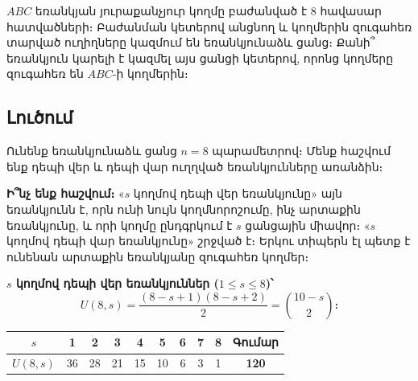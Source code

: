 \documentclass[12pt, a4paper]{article}
\begin{document}
\begin{theorybox}
\begin{center}
\end{center}
\end{theorybox}

\begin{problembox}
$ABC$ եռանկյան յուրաքանչյուր կողմը բաժանված է $8$ հավասար հատվածների։
Բաժանման կետերով անցնող և կողմերին զուգահեռ տարված ուղիղները կազմում են եռանկյունաձև ցանց։
Քանի՞ եռանկյուն կարելի է կազմել այս ցանցի կետերով, որոնց կողմերը զուգահեռ են $ABC$-ի կողմերին։
\end{problembox}

\subsection*{Լուծում}

Ունենք եռանկյունաձև ցանց $n = 8$ պարամետրով։ Մենք հաշվում ենք դեպի վեր և դեպի վար ուղղված եռանկյունները առանձին։

\textbf{Ի՞նչ ենք հաշվում։}\; «$s$ կողմով դեպի վեր եռանկյունը» այն եռանկյունն է, որն ունի նույն կողմնորոշումը, ինչ արտաքին եռանկյունը, և որի կողմը ընդգրկում է $s$ ցանցային միավոր։ «$s$ կողմով դեպի վար եռանկյունը» շրջված է։ Երկու տիպերն էլ պետք է ունենան արտաքին եռանկյանը զուգահեռ կողմեր։

\textbf{$s$ կողմով դեպի վեր եռանկյուններ ($1 \le s \le 8$)՝}
\[
  U(8,s) = \frac{(8-s+1)(8-s+2)}{2} = \binom{10-s}{2}։
\]

\begin{center}
\renewcommand{\arraystretch}{1.3}
\begin{tabular}{c|cccccccc|c}
\toprule
$s$ & 1 & 2 & 3 & 4 & 5 & 6 & 7 & 8 & Գումար \\
\midrule
$U(8,s)$ & 36 & 28 & 21 & 15 & 10 & 6 & 3 & 1 & \textbf{120} \\
\bottomrule
\end{tabular}
\end{center}
\end{document}
